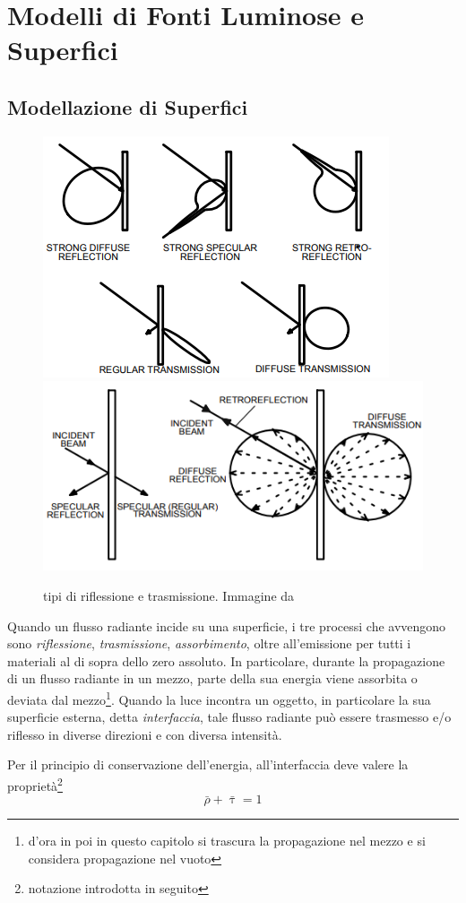 \chapter{Modelli di Fonti Luminose e Superfici}\label{chapter3}
\section{Modellazione di Superfici}
\begin{figure}[tb]
	\centering
	\includegraphics[width=0.4\linewidth]{../assets/chapter3_surfaces_interaction_types.png}
	\includegraphics[width=0.4\linewidth]{../assets/chapter3_surfaces_specular_interaction.png}
	\caption{tipi di riflessione e trasmissione. Immagine da \cite{art-rad}}
	\label{chapter3:surface:interactionTypes}
\end{figure}
Quando un flusso radiante incide su una superficie, i tre processi che avvengono sono \textit{riflessione}, \textit{trasmissione}, 
\textit{assorbimento}, oltre all'emissione per tutti i materiali al di sopra dello zero assoluto. 
In particolare, durante la propagazione di un flusso radiante in un mezzo, parte della sua energia viene assorbita o 
deviata dal mezzo\footnote{d'ora in poi in questo capitolo si trascura la propagazione nel mezzo e si considera propagazione nel vuoto}.
Quando la luce incontra un oggetto, in particolare la sua superficie esterna, detta \textit{interfaccia}, tale flusso radiante pu\`o essere 
trasmesso e/o riflesso in diverse direzioni e con diversa intensit\`a.\par
Per il principio di conservazione dell'energia, all'interfaccia deve valere la propriet\`a\footnote{notazione introdotta in seguito}
\begin{equation}\label{chapter3:surface:interfaceEnergyConservation}
	\bar{\rho} + \bar{\uptau} = 1
\end{equation}
